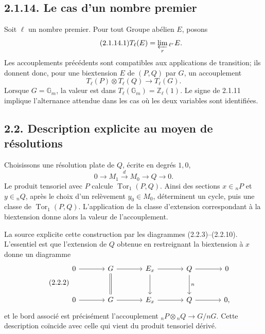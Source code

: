 \documentclass[11pt]{article}
\providecommand{\Tor}{\operatorname{Tor}}
\providecommand{\Gm}{\mathbb G_m}
\providecommand{\limproj}{\varprojlim}
\begin{document}
\subsection*{2.1.14. Le cas d'un nombre premier}

Soit \(\ell\) un nombre premier.  Pour tout Groupe abélien \(E\), posons
\begin{equation}\tag{2.1.14.1}
        T_\ell(E)=\limproj_r{}_{\ell^r}E.
\end{equation}
Les accouplements précédents sont compatibles aux applications de transition; ils donnent donc, pour une biextension \(E\) de \((P,Q)\) par \(G\), un accouplement
\begin{equation}\tag{2.1.14.2}
        T_\ell(P)\otimes T_\ell(Q)\longrightarrow T_\ell(G).
\end{equation}
Lorsque \(G=\Gm\), la valeur est dans \(T_\ell(\Gm)=\mathbb Z_\ell(1)\).  Le signe de 2.1.11 implique l'alternance attendue dans les cas où les deux variables sont identifiées.

\subsection*{2.2. Description explicite au moyen de résolutions}

Choisissons une résolution plate de \(Q\), écrite en degrés \(1,0\),
\begin{equation}\tag{2.2.1}
        0\longrightarrow M_1\xrightarrow{d}M_0\longrightarrow Q\longrightarrow0.
\end{equation}
Le produit tensoriel avec \(P\) calcule \(\Tor_1(P,Q)\).  Ainsi des sections \(x\in{}_nP\) et \(y\in{}_nQ\), après le choix d'un relèvement \(y_0\in M_0\), déterminent un cycle, puis une classe de \(\Tor_1(P,Q)\).  L'application de la classe d'extension correspondant à la biextension donne alors la valeur de l'accouplement.

La source explicite cette construction par les diagrammes (2.2.3)--(2.2.10).  L'essentiel est que l'extension de \(Q\) obtenue en restreignant la biextension à \(x\) donne un diagramme
\begin{equation}\tag{2.2.2}
\begin{tikzcd}[column sep=large,row sep=large]
0\arrow[r]&G\arrow[r]\arrow[d,equal]&E_x\arrow[r]\arrow[d]&Q\arrow[r]\arrow[d,"n"]&0\\
0\arrow[r]&G\arrow[r]&E_x\arrow[r]&Q\arrow[r]&0,
\end{tikzcd}
\end{equation}
et le bord associé est précisément l'accouplement \({}_nP\otimes{}_nQ\to G/nG\).  Cette description coïncide avec celle qui vient du produit tensoriel dérivé.
\end{document}
